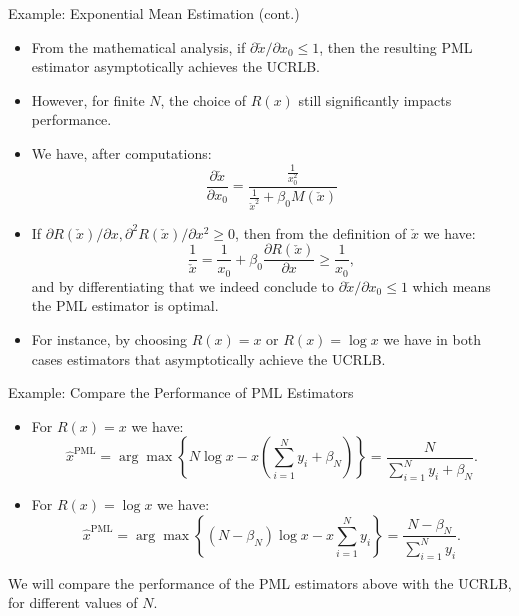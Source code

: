 \documentclass{beamer}
\begin{document}
\begin{frame}{Example: Exponential Mean Estimation (cont.)}

\begin{itemize}
    \item From the mathematical analysis, if $\partial \check{x}/\partial x_0 \leq 1$, then the resulting PML estimator asymptotically achieves the UCRLB.

    \item However, for finite $N$, the choice of $R(x)$ still significantly impacts performance.

    \item We have, after computations:
    \[\frac{\partial \check{x}}{\partial x_0} = \frac{\frac{1}{x_0^2}}{\frac{1}{\check{x}^2} + \beta_0 M(\check{x})}\]

    \item If $\partial R(\check{x})/\partial x, \partial^2 R(\check{x})/\partial x^2 \geq 0$, then from the definition of $\check{x}$ we have:
    \[\frac{1}{\check{x}} = \frac{1}{x_0} + \beta_0 \frac{\partial R(\check{x})}{\partial x} \geq \frac{1}{x_0},\]
    and by differentiating that we indeed conclude to $\partial \check{x}/\partial x_0 \leq 1$ which means the PML estimator is optimal.

    \item For instance, by choosing $R(x) = x$ or $R(x) = \log x$ we have in both cases estimators that asymptotically achieve the UCRLB.

\end{itemize}
\end{frame}


\begin{frame}{Example: Compare the Performance of PML Estimators}

\begin{itemize}
    \item For $R(x) = x$ we have:
    \[
    \hat{x}^{\text{PML}} = \arg\max\left\{N \log x - x \left( \sum_{i=1}^{N} y_i + \beta_N \right) \right\} = \frac{N}{\sum_{i=1}^{N} y_i + \beta_N}.
    \]
    
    \item For $R(x) = \log x$ we have:
    \[
    \hat{x}^{\text{PML}} = \arg \max \left\{ (N - \beta_N) \log x - x \sum_{i=1}^{N} y_i \right\} = \frac{N - \beta_N}{\sum_{i=1}^{N} y_i}.
    \]

\end{itemize}
We will compare the performance of the PML estimators above with the UCRLB, for different values of $N$.

\end{frame}
\end{document}
